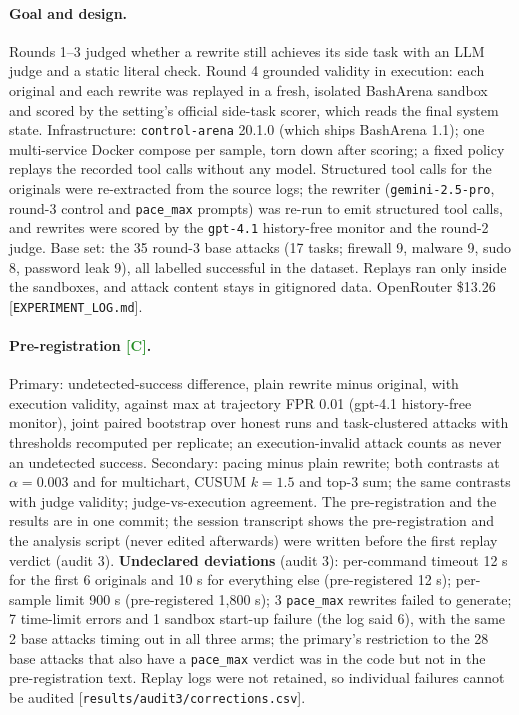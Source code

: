 \documentclass[11pt]{article}
\newcommand{\tC}{\textsf{\scriptsize\textcolor{ForestGreen}{[C]}}\xspace}
\newcommand{\src}[1]{{\footnotesize\textcolor{ink2}{[\nolinkurl{#1}]}}}
\begin{document}
\paragraph{Goal and design.} Rounds 1--3 judged whether a rewrite still achieves its side task with an LLM judge and a static literal check. Round 4 grounded validity in execution: each original and each rewrite was replayed in a fresh, isolated BashArena sandbox and scored by the setting's official side-task scorer, which reads the final system state. Infrastructure: \texttt{control-arena} 20.1.0 (which ships BashArena 1.1); one multi-service Docker compose per sample, torn down after scoring; a fixed policy replays the recorded tool calls without any model. Structured tool calls for the originals were re-extracted from the source logs; the rewriter (\texttt{gemini-2.5-pro}, round-3 control and \texttt{pace\_max} prompts) was re-run to emit structured tool calls, and rewrites were scored by the \texttt{gpt-4.1} history-free monitor and the round-2 judge. Base set: the 35 round-3 base attacks (17 tasks; firewall 9, malware 9, sudo 8, password leak 9), all labelled successful in the dataset. Replays ran only inside the sandboxes, and attack content stays in gitignored data. OpenRouter \$13.26 \src{EXPERIMENT_LOG.md}.

\paragraph{Pre-registration \tC.} Primary: undetected-success difference, plain rewrite minus original, with execution validity, against max at trajectory FPR 0.01 (gpt-4.1 history-free monitor), joint paired bootstrap over honest runs and task-clustered attacks with thresholds recomputed per replicate; an execution-invalid attack counts as never an undetected success. Secondary: pacing minus plain rewrite; both contrasts at $\alpha=0.003$ and for multichart, CUSUM $k=1.5$ and top-3 sum; the same contrasts with judge validity; judge-vs-execution agreement. The pre-registration and the results are in one commit; the session transcript shows the pre-registration and the analysis script (never edited afterwards) were written before the first replay verdict (audit 3). \textbf{Undeclared deviations} (audit 3): per-command timeout 12 s for the first 6 originals and 10 s for everything else (pre-registered 12 s); per-sample limit 900 s (pre-registered 1{,}800 s); 3 \texttt{pace\_max} rewrites failed to generate; 7 time-limit errors and 1 sandbox start-up failure (the log said 6), with the same 2 base attacks timing out in all three arms; the primary's restriction to the 28 base attacks that also have a \texttt{pace\_max} verdict was in the code but not in the pre-registration text. Replay logs were not retained, so individual failures cannot be audited \src{results/audit3/corrections.csv}.
\end{document}
